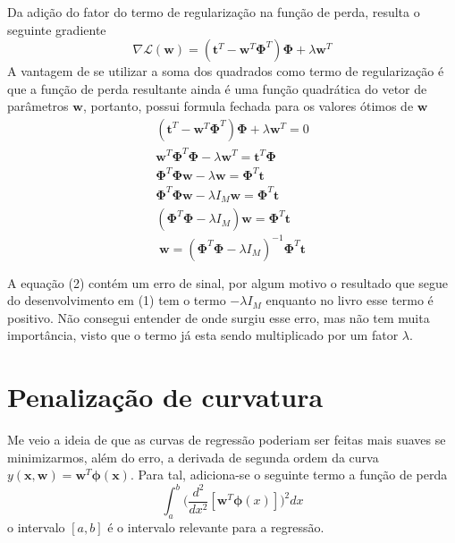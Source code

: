 \documentclass{article}
\begin{document}
Da adição do fator do termo de regularização na função de perda, resulta o seguinte gradiente
\[
    \nabla \mathcal{L}(\textbf{w}) = (\textbf{t}^T - \textbf{w}^T \boldsymbol{\Phi}^T) \boldsymbol{\Phi} + \lambda \textbf{w}^T
\]
A vantagem de se utilizar a soma dos quadrados como termo de regularização é que a função de perda resultante
ainda é uma função quadrática do vetor de parâmetros \( \textbf{w} \), portanto, possui formula fechada para
os valores ótimos de \( \textbf{w} \)
\begin{gather}
    \nonumber
    (\textbf{t}^T - \textbf{w}^T \boldsymbol{\Phi}^T) \boldsymbol{\Phi} + \lambda \textbf{w}^T = 0              \\ \nonumber
    \textbf{w}^T \boldsymbol{\Phi}^T \boldsymbol{\Phi} - \lambda \textbf{w}^T = \textbf{t}^T \boldsymbol{\Phi}  \\
    \boldsymbol{\Phi}^T \boldsymbol{\Phi} \textbf{w} - \lambda \textbf{w} = \boldsymbol{\Phi}^T \textbf{t}      \\ \nonumber
    \boldsymbol{\Phi}^T \boldsymbol{\Phi} \textbf{w} - \lambda I_M \textbf{w} = \boldsymbol{\Phi}^T \textbf{t}  \\ \nonumber
    (\boldsymbol{\Phi}^T \boldsymbol{\Phi} - \lambda I_M) \textbf{w} = \boldsymbol{\Phi}^T \textbf{t}
\end{gather}
\begin{equation}
    \textbf{w} = (\boldsymbol{\Phi}^T \boldsymbol{\Phi} - \lambda I_M)^{-1} \boldsymbol{\Phi}^T \textbf{t}
\end{equation}

A equação (2) contém um erro de sinal, por algum motivo o resultado que segue do desenvolvimento em (1) tem o termo
\( - \lambda I_M \) enquanto no livro esse termo é positivo. Não consegui entender de onde surgiu esse erro, mas não tem muita
importância, visto que o termo já esta sendo multiplicado por um fator \( \lambda \).

\section{Penalização de curvatura}

Me veio a ideia de que as curvas de regressão poderiam ser feitas mais suaves se minimizarmos, além do erro, a derivada
de segunda ordem da curva \( y(\textbf{x}, \textbf{w}) = \textbf{w}^T \boldsymbol{\phi}(\textbf{x}) \). Para tal, adiciona-se
o seguinte termo a função de perda
\begin{equation}
    \int_{a}^{b} \bigg( \frac{d^2}{dx^2} [ \textbf{w}^T \boldsymbol{\phi}(x) ] \bigg)^2 dx
\end{equation}
o intervalo \( [a, b] \) é o intervalo relevante para a regressão.
\end{document}
